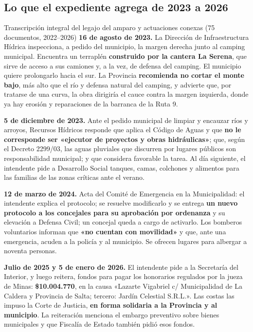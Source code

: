\subsection*{Lo que el expediente agrega de 2023 a 2026}

\begin{ficha}{Transcripción integral del legajo del amparo y actuaciones conexas (75 documentos, 2022--2026)}
\textbf{16 de agosto de 2023.} La Dirección de Infraestructura Hídrica inspecciona, a pedido del municipio, la margen derecha junto al camping municipal. Encuentra un terraplén \textbf{construido por la cantera La Serena}, que sirve de acceso a sus camiones y, a la vez, de defensa del camping. El municipio quiere prolongarlo hacia el sur. La Provincia \textbf{recomienda no cortar el monte bajo}, más alto que el río y defensa natural del camping, y advierte que, por tratarse de una curva, la obra dirigiría el cauce contra la margen izquierda, donde ya hay erosión y reparaciones de la barranca de la Ruta 9.

\textbf{5 de diciembre de 2023.} Ante el pedido municipal de limpiar y encauzar ríos y arroyos, Recursos Hídricos responde que aplica el Código de Aguas y que \textbf{no le corresponde ser «ejecutor de proyectos y obras hidráulicas»}; que, según el Decreto 2299/03, las aguas pluviales que discurren por lugares públicos son responsabilidad municipal; y que considera favorable la tarea. Al día siguiente, el intendente pide a Desarrollo Social tanques, camas, colchones y alimentos para las familias de las zonas críticas ante el verano.

\textbf{12 de marzo de 2024.} Acta del Comité de Emergencia en la Municipalidad: el intendente explica el protocolo; se resuelve modificarlo y se entrega \textbf{un nuevo protocolo a los concejales para su aprobación por ordenanza} y su elevación a Defensa Civil; un concejal queda a cargo de activarlo. Los bomberos voluntarios informan que \textbf{«no cuentan con movilidad»} y que, ante una emergencia, acuden a la policía y al municipio. Se ofrecen lugares para albergar a noventa personas.

\textbf{Julio de 2025 y 5 de enero de 2026.} El intendente pide a la Secretaría del Interior, y luego reitera, fondos para pagar los honorarios regulados por la jueza de Minas: \textbf{\$10.004.770}, en la causa «Lazarte Vigabriel c/ Municipalidad de La Caldera y Provincia de Salta; tercero: Jardín Celestial S.R.L.». Las costas las impuso la Corte de Justicia, \textbf{en forma solidaria a la Provincia y al municipio}. La reiteración menciona el embargo preventivo sobre bienes municipales y que Fiscalía de Estado también pidió esos fondos.


\end{ficha}
